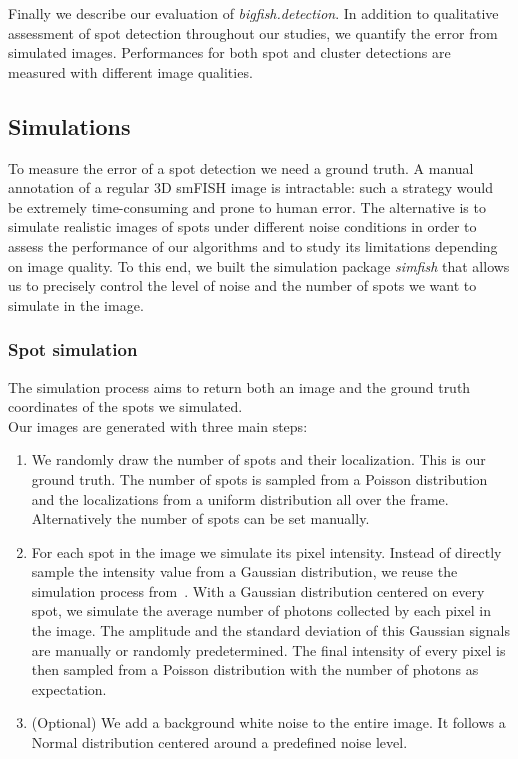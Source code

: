 Finally we describe our evaluation of \emph{bigfish.detection}.
In addition to qualitative assessment of spot detection throughout our studies, we quantify the error from simulated images.
Performances for both spot and cluster detections are measured with different image qualities.

\subsection{Simulations}
\label{subsec:simulation}

To measure the error of a spot detection we need a ground truth.
A manual annotation of a regular 3D \ac{smFISH} image is intractable: such a strategy would be extremely time-consuming and prone to human error.
The alternative is to simulate realistic images of spots under different noise conditions in order to assess the performance of our algorithms and to study its limitations depending on image quality.
To this end, we built the simulation package \emph{simfish} that allows us to precisely control the level of noise and the number of spots we want to simulate in the image.

\subsubsection{Spot simulation}

The simulation process aims to return both an image and the ground truth coordinates of the spots we simulated.\\

\noindent
Our images are generated with three main steps:
\begin{enumerate}
	\item We randomly draw the number of spots and their localization.
	This is our ground truth.
	The number of spots is sampled from a Poisson distribution and the localizations from a uniform distribution all over the frame.
	Alternatively the number of spots can be set manually.
	\item For each spot in the image we simulate its pixel intensity.
	Instead of directly sample the intensity value from a Gaussian distribution, we reuse the simulation process from~\cite{bahry_rs-fish_2021}.
	With a Gaussian distribution centered on every spot, we simulate the average number of photons collected by each pixel in the image.
	The amplitude and the standard deviation of this Gaussian signals are manually or randomly predetermined.
	The final intensity of every pixel is then sampled from a Poisson distribution with the number of photons as expectation.
	\item (Optional) We add a background white noise to the entire image.
	It follows a Normal distribution centered around a predefined noise level.
\end{enumerate}

